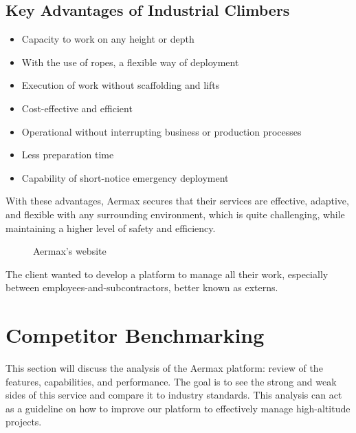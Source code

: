 \subsection*{Key Advantages of Industrial Climbers}
\begin{itemize}
  \item Capacity to work on any height or depth
  \item With the use of ropes, a flexible way of deployment
  \item Execution of work without scaffolding and lifts
  \item Cost-effective and efficient
  \item Operational without interrupting business or production processes
  \item Less preparation time
  \item Capability of short-notice emergency deployment
\end{itemize}

With these advantages, Aermax secures that their services are effective, adaptive, and flexible with any surrounding environment, which is quite challenging, while maintaining a higher level of safety and efficiency.

\begin{figure}[H]
    \centering
    \caption{Aermax’s website}
    \label{fig:aermax-website}
\end{figure}

The client wanted to develop a platform to manage all their work, especially between employees-and-subcontractors, better known as externs.

\section{Competitor Benchmarking}
This section will discuss the analysis of the Aermax platform: review of the features, capabilities, and performance. The goal is to see the strong and weak sides of this service and compare it to industry standards. This analysis can act as a guideline on how to improve our platform to effectively manage high-altitude projects.
